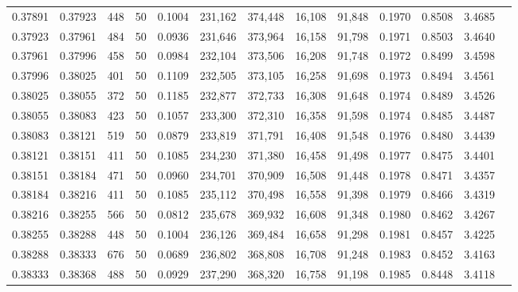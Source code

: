\begin{tabular}{rrrrrrrrrrrrr}
0.37891 & 0.37923 &   448 &  50 &                                     0.1004 & 231,162 & 374,448 &  16,108 &  91,848 & 0.1970 & 0.8508 & 3.4685 \\
0.37923 & 0.37961 &   484 &  50 &                                     0.0936 & 231,646 & 373,964 &  16,158 &  91,798 & 0.1971 & 0.8503 & 3.4640 \\
0.37961 & 0.37996 &   458 &  50 &                                     0.0984 & 232,104 & 373,506 &  16,208 &  91,748 & 0.1972 & 0.8499 & 3.4598 \\
0.37996 & 0.38025 &   401 &  50 &                                     0.1109 & 232,505 & 373,105 &  16,258 &  91,698 & 0.1973 & 0.8494 & 3.4561 \\
0.38025 & 0.38055 &   372 &  50 &                                     0.1185 & 232,877 & 372,733 &  16,308 &  91,648 & 0.1974 & 0.8489 & 3.4526 \\
0.38055 & 0.38083 &   423 &  50 &                                     0.1057 & 233,300 & 372,310 &  16,358 &  91,598 & 0.1974 & 0.8485 & 3.4487 \\
0.38083 & 0.38121 &   519 &  50 &                                     0.0879 & 233,819 & 371,791 &  16,408 &  91,548 & 0.1976 & 0.8480 & 3.4439 \\
0.38121 & 0.38151 &   411 &  50 &                                     0.1085 & 234,230 & 371,380 &  16,458 &  91,498 & 0.1977 & 0.8475 & 3.4401 \\
0.38151 & 0.38184 &   471 &  50 &                                     0.0960 & 234,701 & 370,909 &  16,508 &  91,448 & 0.1978 & 0.8471 & 3.4357 \\
0.38184 & 0.38216 &   411 &  50 &                                     0.1085 & 235,112 & 370,498 &  16,558 &  91,398 & 0.1979 & 0.8466 & 3.4319 \\
0.38216 & 0.38255 &   566 &  50 &                                     0.0812 & 235,678 & 369,932 &  16,608 &  91,348 & 0.1980 & 0.8462 & 3.4267 \\
0.38255 & 0.38288 &   448 &  50 &                                     0.1004 & 236,126 & 369,484 &  16,658 &  91,298 & 0.1981 & 0.8457 & 3.4225 \\
0.38288 & 0.38333 &   676 &  50 &                                     0.0689 & 236,802 & 368,808 &  16,708 &  91,248 & 0.1983 & 0.8452 & 3.4163 \\
0.38333 & 0.38368 &   488 &  50 &                                     0.0929 & 237,290 & 368,320 &  16,758 &  91,198 & 0.1985 & 0.8448 & 3.4118 \\

\end{tabular}
